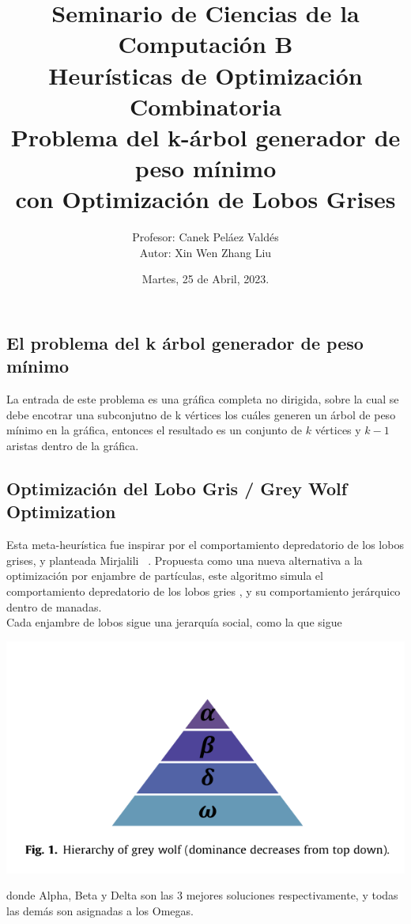 \documentclass[a4paper]{report}
\title { \Large{Seminario de Ciencias de la Computaci\'on B}\protect\\
  \large{Heurísticas de Optimización Combinatoria}\protect\\
  \large{Problema del k-\'arbol generador de peso m\'inimo\\con Optimización de Lobos Grises}}
\date{\normalsize{Martes, 25 de Abril, 2023.}}
\author{\normalsize{Profesor: Canek Peláez Valdés}\protect\\
  \normalsize{Autor: Xin Wen Zhang Liu}}\vspace{0.2cm}
\begin{document}
\allowdisplaybreaks
\maketitle

\subsection*{El problema del k \'arbol generador de peso m\'inimo}
La entrada de este problema es una gr\'afica completa no dirigida, sobre la cual se debe encotrar una subconjutno de k v\'ertices los cu\'ales generen un \'arbol de peso m\'inimo en la gr\'afica, entonces el resultado es un conjunto de $k$ v\'ertices y $k-1$ aristas dentro de la gr\'afica. 


\subsection*{Optimizaci\'on del Lobo Gris / Grey Wolf Optimization}
Esta meta-heur\'istica fue inspirar por el comportamiento depredatorio de los lobos grises, y planteada Mirjalili
~\cite{MIRJALILI201446}. Propuesta como una nueva alternativa a la optimización por enjambre de
part\'iculas, este algoritmo simula el comportamiento depredatorio de los lobos gries , y su comportamiento jer\'arquico dentro de manadas.\\

Cada enjambre de lobos sigue una jerarqu\'ia social, como la que sigue
\begin{center}
  \includegraphics[width=\textwidth]{1682483544.png}
\end{center}

donde Alpha, Beta y Delta son las 3 mejores soluciones respectivamente, y todas las dem\'as son asignadas a los Omegas.
\end{document}
